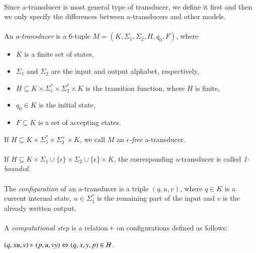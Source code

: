 \paragraph{}
Since a-transducer is most general type of transducer, we define it first and then we only specify the differences between a-transducers and other models.

\paragraph{}
 An \emph{a-transducer} is a 6-tuple $M=(K, \Sigma_{1}, \Sigma_{2}, H, q_{0}, F)$, where
\begin{itemize}
\item $K$ is a finite set of states,
\item $\Sigma_{1} $ and $\Sigma_{2} $ are the input and output alphabet, respectively,
\item $H \subseteq K \times \Sigma_{1}^{*} \times \Sigma_{2}^{*} \times K$ is the transition function, where $H$ is finite,
\item $q_{0} \in K$ is the initial state,
\item $F \subseteq K$ is a set of accepting states.
\end{itemize}
If $H \subseteq K \times \Sigma_{1}^{*} \times \Sigma_{2}^{+} \times K$, we call $M$ an \emph{$\epsilon $-free} a-transducer.

\paragraph{}
 If $H \subseteq K \times \Sigma_{1} \cup \{ \epsilon \} \times \Sigma_{2} \cup \{ \epsilon \} \times K$, the corresponding a-transducer is called \emph{1-bounded}.

\paragraph{}
 The \emph{configuration} of an a-transducer is a triple $(q, u, v)$, where $q \in K$ is a current internal state, $u \in \Sigma_{1}^{*}$ is the remaining part of the input and $v$ is the already written output.

\paragraph{}
 A \emph{computational step} is a relation $\vdash$ on configurations defined as follows: \\
\centerline{$(q, xu, v) \vdash (p, u, vy) \Leftrightarrow (q, x, y, p) \in H$.}


